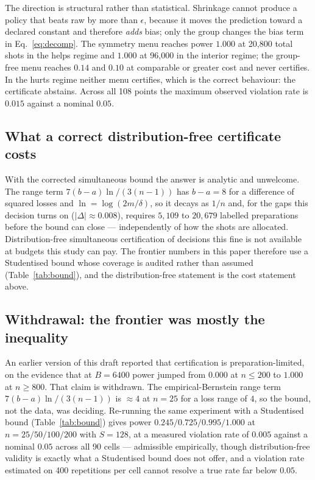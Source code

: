 \documentclass{article}
\begin{document}


The direction is structural rather than statistical. Shrinkage cannot produce a policy that beats raw
by more than $\epsilon$, because it moves the prediction toward a declared constant and therefore
\emph{adds} bias; only the group changes the bias term in Eq.~\eqref{eq:decomp}. The symmetry menu
reaches power $1.000$ at 20{,}800 total shots in the helps regime and $1.000$ at 96{,}000 in the
interior regime; the group-free menu reaches $0.14$ and $0.10$ at comparable or greater cost and never
certifies. In the hurts regime neither menu certifies, which is the correct behaviour: the certificate
abstains. Across all 108 points the maximum observed violation rate is $0.015$ against a nominal
$0.05$.

\subsection{What a correct distribution-free certificate costs}
\label{sec:mpcost}
With the corrected simultaneous bound the answer is analytic and unwelcome. The range term
$7(b-a)\ln/(3(n-1))$ has $b-a=8$ for a difference of squared losses and $\ln=\log(2m/\delta)$, so it
decays as $1/n$ and, for the gaps this decision turns on ($|\Delta|\approx0.008$), requires $5{,}109$
to $20{,}679$ labelled preparations before the bound can close --- independently of how the shots are
allocated. Distribution-free simultaneous certification of decisions this fine is not available at
budgets this study can pay. The frontier numbers in this paper therefore use a Studentised bound whose
coverage is audited rather than assumed (Table~\ref{tab:bound}), and the distribution-free statement is
the cost statement above.



\subsection{Withdrawal: the frontier was mostly the inequality}
\label{sec:withdraw}
An earlier version of this draft reported that certification is preparation-limited, on the evidence
that at $B=6400$ power jumped from $0.000$ at $n\le200$ to $1.000$ at $n\ge800$. That claim is
withdrawn. The empirical-Bernstein range term $7(b-a)\ln/(3(n-1))$ is $\approx4$ at $n=25$ for a
loss range of $4$, so the bound, not the data, was deciding. Re-running the same experiment with a
Studentised bound (Table~\ref{tab:bound}) gives power $0.245/0.725/0.995/1.000$ at
$n=25/50/100/200$ with $S=128$, at a measured violation rate of $0.005$ against a nominal $0.05$
across all 90 cells --- admissible empirically, though distribution-free validity is exactly what a
Studentised bound does not offer, and a violation rate estimated on 400 repetitions per cell cannot
resolve a true rate far below $0.05$.
\end{document}
